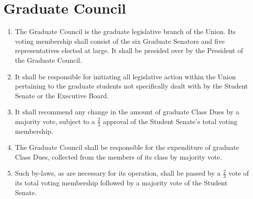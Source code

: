 \documentclass[12pt]{constitution}
\begin{document}
\section{Graduate Council}
\begin{enumerate}
\item The Graduate Council is the graduate legislative branch of the Union. Its voting membership shall consist of the six Graduate Senators and five representatives elected at large. It shall be presided over by the President of the Graduate Council.
\item It shall be responsible for initiating all legislative action within the Union pertaining to the graduate students not specifically dealt with by the Student Senate or the Executive Board.
\item It shall recommend any change in the amount of graduate Class Dues by a majority vote, subject
to a $\frac{2}{3}$ approval of the Student Senate’s total voting membership.
\item The Graduate Council shall be responsible for the expenditure of graduate Class Dues, collected from the members of its class by majority vote.
\item Such by-laws, as are necessary for its operation, shall be passed by a $\frac{2}{3}$ vote of its total voting membership followed by a majority vote of the Student Senate.
\end{enumerate}
\end{document}
